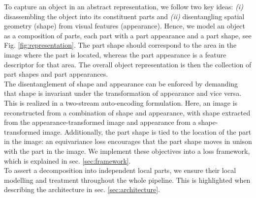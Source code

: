 	To capture an object in an abstract representation, we follow two key ideas: \emph{(i)} disassembling the object into its constituent parts and \emph{(ii)} disentangling spatial geometry (shape) from visual features (appearance). Hence, we model an object as a composition of parts, each part with a part appearance and a part shape, see Fig. \ref{fig:representation}. The part shape should correspond to the area in the image where the part is located, whereas the part appearance is a feature descriptor for that area. The overall object representation is then the collection of part shapes and part appearances. \\
	The disentanglement of shape and appearance can be enforced by demanding that shape is invariant under the transformation of appearance and vice versa. This is realized in a two-stream auto-encoding formulation. Here, an image is reconstructed from a combination of shape and appearance, with shape extracted from the appearance-transformed image and appearance from a shape-transformed image. Additionally, the part shape is tied to the location of the part in the image: an equivariance loss encourages that the part shape moves in unison with the part in the image. We implement these objectives into a loss framework, which is explained in sec. \ref{sec:framework}. \\
	To assert a decomposition into independent local parts, we ensure their local modelling and treatment throughout the whole pipeline. This is highlighted when describing the architecture in sec. \ref{sec:architecture}.

